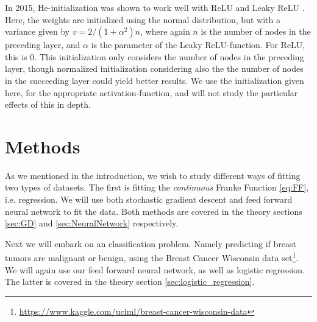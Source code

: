 \documentclass[12pt]{extarticle}
\begin{document}
In 2015, He-initialization was shown to work well with ReLU and Leaky ReLU \cite{He}. Here, the weights are initialized using the normal distribution, but with a variance given by $v = 2/(1 + \alpha^2)n$, where again $n$ is the number of nodes in the preceding layer, and $\alpha$ is the parameter of the Leaky ReLU-function. For ReLU, this is 0. This initialization only considers the number of nodes in the preceding layer, though normalized initialization considering also the the number of nodes in the succeeding layer could yield better results. We use the initialization given here, for the appropriate activation-function, and will not study the particular effects of this in depth.



\section{Methods}
As we mentioned in the introduction, we wish to study different ways of fitting two types of datasets. The first is fitting the \textit{continuous} Franke Function \eqref{eq:FF}, i.e. regression. We will use both stochastic gradient descent and feed forward neural network to fit the data. Both methods are covered in the theory sections \ref{sec:GD} and \ref{sec:NeuralNetwork} respectively.

Next we will embark on an classification problem. Namely predicting if breast tumors are malignant or benign, using the Breast Cancer Wisconsin data set\footnote{\href{https://www.kaggle.com/uciml/breast-cancer-wisconsin-data}{https://www.kaggle.com/uciml/breast-cancer-wisconsin-data}}. We will again use our feed forward neural network, as well as logistic regression. The latter is covered in the theory section \ref{sec:logistic_regression}.
\end{document}
